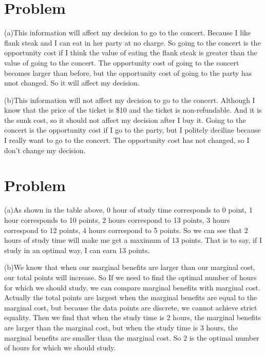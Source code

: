 \documentclass[a4 paper,12pt]{article}
\newcommand{\homework}[3]{
	\pagestyle{myheadings}
	\thispagestyle{plain}
	\newpage
	\setcounter{page}{1}
	\noindent
	\begin{center}
		\framebox{
			\vbox{\vspace{2mm}
				\hbox to 6.28in { {\bf Microeconomics \hfill} {\hfill {\rm #2} {\rm #3}} }
				\vspace{4mm}
				\hbox to 6.28in { {\Large \hfill #1  \hfill} }
				\vspace{3mm}}
		}
	\end{center}
	\vspace*{4mm}
}
\begin{document}
	\homework{Homework01}{Group45}{吴熙楠}
	\tableofcontents
	\newpage
\section{Problem}
(a)This information will affect my decision to go to the concert. Because I like flank steak and I can eat in her party at no charge. So going to the concert is the opportunity cost if I think the value of eating the flank steak is greater than the value of going to the concert. The opportunity cost of going to the concert becomes larger than before, but the opportunity cost of going to the party has nnot changed. So it will affect my decision.
\par (b)This information will not affect my decision to go to the concert. Although I know that the price of the ticket is \$10 and the ticket is non-refundable. And it is the sunk cost, so it should not affect my decision after I buy it. Going to the concert is the opportunity cost if I go to the party, but I politely deciline because I really want to go to the concert. The opportunity cost has not changed, so I don't change my decision. 
\section{Problem}
(a)As shown in the table above, 0 hour of study time corresponds to 0 point, 1 hour corresponds to 10 points, 2 hours correspond to 13 points, 3 hours correspond to 12 points, 4 hours correspond to 5 points. So we can see that 2 hours of study time will make me get a maximum of 13 points. That is to say, if I study in an optimal way, I can earn 13 points. 
\par (b)We know that when our marginal benefits are larger than our marginal cost, our total points will increase. So If we need to find the optimal number of hours for which we should study, we can compare marginal benefits with marginal cost. Actually the total points are largest when the marginal benefits are equal to the marginal cost, but because the data points are discrete, we cannot achieve strict equality. Then we find that when the study time is 2 hours, the marginal benefits are larger than the marginal cost, but when the study time is 3 hours, the marginal benefits are smaller than the marginal cost. So 2 is the optimal number of hours for which we should study.
\end{document}
